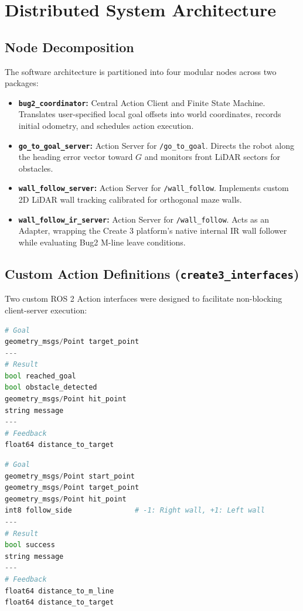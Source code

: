 \documentclass[11pt,a4paper]{article}
\begin{document}
\section{Distributed System Architecture}

\subsection{Node Decomposition}
The software architecture is partitioned into four modular nodes across two packages:

\begin{itemize}[leftmargin=*]
    \item \textbf{\texttt{bug2\_coordinator}:} Central Action Client and Finite State Machine. Translates user-specified local goal offsets into world coordinates, records initial odometry, and schedules action execution.
    \item \textbf{\texttt{go_to_goal_server}:} Action Server for \texttt{/go_to_goal}. Directs the robot along the heading error vector toward $G$ and monitors front LiDAR sectors for obstacles.
    \item \textbf{\texttt{wall_follow_server}:} Action Server for \texttt{/wall_follow}. Implements custom 2D LiDAR wall tracking calibrated for orthogonal maze walls.
    \item \textbf{\texttt{wall_follow_ir_server}:} Action Server for \texttt{/wall_follow}. Acts as an Adapter, wrapping the Create 3 platform's native internal IR wall follower while evaluating Bug2 M-line leave conditions.
\end{itemize}

\subsection{Custom Action Definitions (\texttt{create3_interfaces})}
Two custom ROS 2 Action interfaces were designed to facilitate non-blocking client-server execution:

\begin{lstlisting}[language=Python, caption=GoToGoal.action]
# Goal
geometry_msgs/Point target_point
---
# Result
bool reached_goal
bool obstacle_detected
geometry_msgs/Point hit_point
string message
---
# Feedback
float64 distance_to_target
\end{lstlisting}

\begin{lstlisting}[language=Python, caption=Bug2WallFollow.action]
# Goal
geometry_msgs/Point start_point
geometry_msgs/Point target_point
geometry_msgs/Point hit_point
int8 follow_side               # -1: Right wall, +1: Left wall
---
# Result
bool success
string message
---
# Feedback
float64 distance_to_m_line
float64 distance_to_target
\end{lstlisting}
\end{document}
